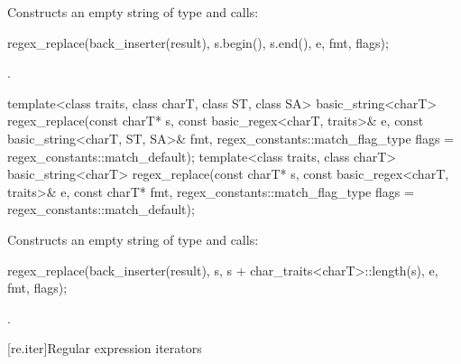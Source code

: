 \begin{itemdescr}
\pnum
\effects
Constructs an empty string  of
type  and calls:
\begin{codeblock}
regex_replace(back_inserter(result), s.begin(), s.end(), e, fmt, flags);
\end{codeblock}

\pnum
\returns
{}.
\end{itemdescr}

%
\begin{itemdecl}
template<class traits, class charT, class ST, class SA>
  basic_string<charT>
    regex_replace(const charT* s,
                  const basic_regex<charT, traits>& e,
                  const basic_string<charT, ST, SA>& fmt,
                  regex_constants::match_flag_type flags = regex_constants::match_default);
template<class traits, class charT>
  basic_string<charT>
    regex_replace(const charT* s,
                  const basic_regex<charT, traits>& e,
                  const charT* fmt,
                  regex_constants::match_flag_type flags = regex_constants::match_default);
\end{itemdecl}

\begin{itemdescr}
\pnum
\effects
Constructs an empty string  of
type  and calls:
\begin{codeblock}
regex_replace(back_inserter(result), s, s + char_traits<charT>::length(s), e, fmt, flags);
\end{codeblock}

\pnum
\returns
{}.
\end{itemdescr}

[re.iter]{Regular expression iterators}

